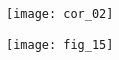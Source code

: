\ifprof
\begin{center}
\texttt{[image: cor\_02]}
\end{center}

\else


\begin{center}
\texttt{[image: fig\_15]}
\end{center}
\fi



